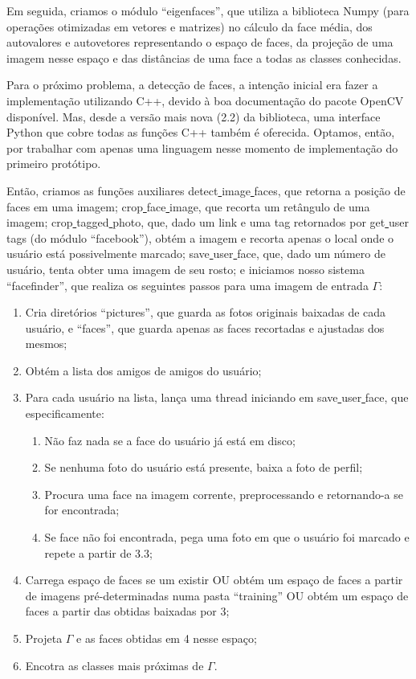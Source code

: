 \documentclass[10pt,a4paper]{article}
\begin{document}
	Em seguida, criamos o módulo “eigenfaces”, que utiliza a biblioteca Numpy (para operações otimizadas em vetores e matrizes) no cálculo da face média, dos autovalores e autovetores representando o espaço de faces, da projeção de uma imagem nesse espaço e das distâncias de uma face a todas as classes conhecidas.

	Para o próximo problema, a detecção de faces, a intenção inicial era fazer a implementação utilizando C++, devido à boa documentação do pacote OpenCV disponível. Mas, desde a versão mais nova (2.2) da biblioteca, uma interface Python que cobre todas as funções C++ também é oferecida. Optamos, então, por trabalhar com apenas uma linguagem nesse momento de implementação do primeiro protótipo.

	Então, criamos as funções auxiliares detect\underline{ }image\underline{ }faces, que
        retorna a posição de faces em uma imagem; crop\underline{ }face\underline{ }image, que
        recorta um retângulo de uma imagem; crop\underline{ }tagged\underline{ }photo, que,
        dado um link e uma tag retornados por get\underline{ }user\underline{ }tags (do módulo
        “facebook”), obtém a imagem e recorta apenas o local onde o
        usuário está possivelmente marcado; save\underline{ }user\underline{ }face, que, dado
        um número de usuário, tenta obter uma imagem de seu rosto; e
        iniciamos nosso sistema “facefinder”, que realiza os seguintes
        passos para uma imagem de entrada $\Gamma$:


\begin{enumerate}
	\item Cria diretórios “pictures”, que guarda as fotos originais baixadas de cada usuário, e “faces”, que guarda apenas as faces recortadas e ajustadas dos mesmos;
	\item Obtém a lista dos amigos de amigos do usuário;
	\item Para cada usuário na lista, lança uma thread iniciando
          em save\underline{ }user\underline{ }face, que
          especificamente:
          \begin{enumerate}
          \item Não faz nada se a face do usuário já está em disco;
          \item Se nenhuma foto do usuário está presente, baixa a
            foto de perfil;	
          \item Procura uma face na imagem corrente, preprocessando e retornando-a se for encontrada;
          \item Se face não foi encontrada, pega uma foto em que
            o usuário foi marcado e repete a partir de 3.3;
          \end{enumerate}
	\item Carrega espaço de faces se um existir OU obtém um espaço de faces a partir de imagens pré-determinadas numa pasta “training” OU obtém um espaço de faces a partir das obtidas baixadas por 3;
	\item Projeta $\Gamma$ e as faces obtidas em 4 nesse espaço;
	\item Encotra as classes mais próximas de $\Gamma$.
\end{enumerate}
\end{document}
